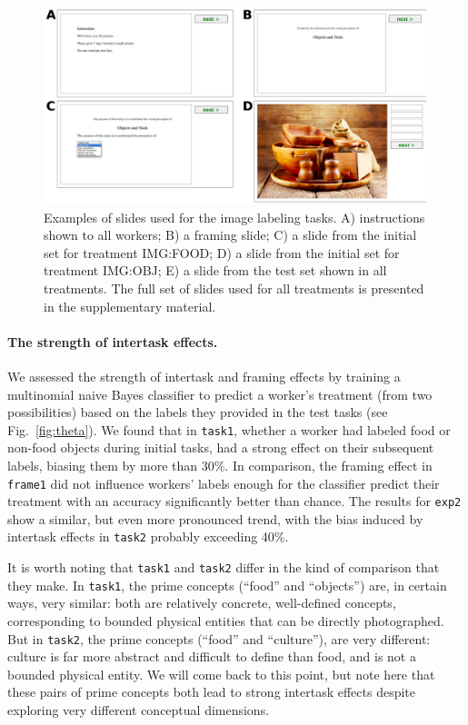 \documentclass[12pt]{article}
\begin{document}
\begin{figure}
	\centering
	\includegraphics[scale=0.7]{figs/tasks.pdf}
	\caption{Examples of slides used for the image labeling tasks. A) instructions shown to all workers; B) a framing slide; C) a slide from the initial set for treatment IMG:FOOD; D) a slide from the initial set for treatment IMG:OBJ; E) a slide from the test set shown in all treatments. The full set of slides used for all treatments is presented in the supplementary material.}
	\label{fig:task}
\end{figure}


\paragraph{The strength of intertask effects.}

We assessed the strength of intertask and framing effects
by training a multinomial naive Bayes classifier to predict a worker's 
treatment (from two possibilities) based on the labels they provided 
in the test tasks (see Fig.~\ref{fig:theta}).
We found that in \texttt{task1}, whether a worker had labeled food or non-food 
objects during initial tasks, had a strong effect on their subsequent labels, 
biasing them by more than 30\%.  In comparison, the framing effect in \texttt{frame1} did 
not influence workers' labels enough for the classifier predict their treatment
with an accuracy significantly better than chance.  The results for 
\texttt{exp2} show a similar, but even more pronounced trend, with the bias
induced by intertask effects in \texttt{task2} probably exceeding 40\%.

It is worth noting that \texttt{task1} and \texttt{task2} differ in the kind
of comparison that they make.  In \texttt{task1},
the prime concepts (``food'' and ``objects'') are, in certain ways, very 
similar: both are relatively concrete, well-defined concepts, corresponding
to bounded physical entities that can be directly photographed.
But in \texttt{task2}, the prime concepts (``food'' and ``culture''), 
are very different:  culture is far more abstract and difficult to define
than food, and is not a bounded physical entity.  We will come back to this 
point, but note 
here that these pairs of prime concepts both lead to strong intertask effects
despite exploring very different conceptual dimensions.
\end{document}
